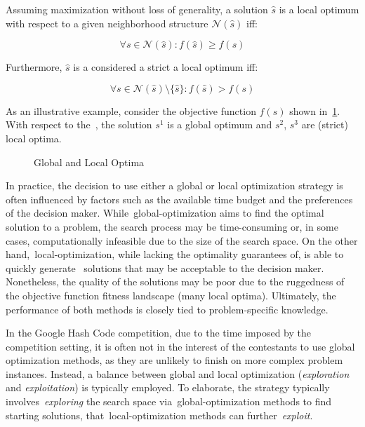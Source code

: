 \begin{definition}
  \label{def:local-optimum}

  Assuming maximization without loss of generality, a solution $\hat{s}$ is
  a local optimum with respect to a given neighborhood structure $\mathcal{N}(\hat{s})$ iff:

  \begin{equation}
    \label{eq:local-optimum}
    \forall s \in \mathcal{N}(\hat{s}) \colon f(\hat{s}) \geq f(s)
  \end{equation}

  Furthermore, $\hat{s}$ is a considered a strict a local optimum iff:

  \begin{equation}
    \label{eq:strict-local-optimum}
    \forall s \in \mathcal{N}(\hat{s}) \setminus \{\hat{s}\} \colon f(\hat{s}) > f(s)
  \end{equation}
\end{definition}

As an illustrative example, consider the objective function $f(s)$ shown in~\ref{fig:optima}.
With respect to the~, the solution
$s^1$ is a global optimum and $s^2$, $s^3$ are (strict) local optima.

\begin{figure}[h]
  \centering
  
  \caption{Global and Local Optima}
  \label{fig:optima}
\end{figure}

In practice, the decision to use either a global or local optimization strategy
is often influenced by factors such as the available time budget and the
preferences of the decision maker. While~\acrshort{global-optimization} aims to
find the optimal solution to a problem, the search process may be time-consuming
or, in some cases, computationally infeasible due to the size of the search
space.  On the other hand,~\acrshort{local-optimization}, while lacking the
optimality guarantees of, is able to quickly generate~ solutions that may be
acceptable to the decision maker. Nonetheless, the quality of the solutions may
be poor due to the ruggedness of the objective function fitness landscape (many
local optima). Ultimately, the performance of both methods is closely tied to
problem-specific knowledge.

In the Google Hash Code competition, due to the time imposed by the competition
setting, it is often not in the interest of the contestants to use global
optimization methods, as they are unlikely to finish on more complex problem
instances. Instead, a balance between global and local optimization
(\textit{exploration} and \textit{exploitation}) is typically employed. To
elaborate, the strategy typically involves~\textit{exploring} the search space
via~\acrshort{global-optimization} methods to find~ starting
solutions, that~\acrshort{local-optimization} methods can
further~\textit{exploit}.


